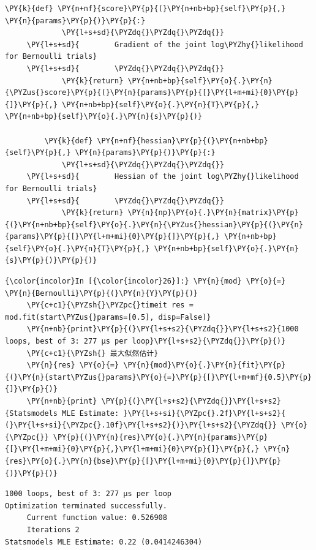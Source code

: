 \begin{Verbatim}[commandchars=\\\{\}]
         \PY{k}{def} \PY{n+nf}{score}\PY{p}{(}\PY{n+nb+bp}{self}\PY{p}{,} \PY{n}{params}\PY{p}{)}\PY{p}{:}
             \PY{l+s+sd}{\PYZdq{}\PYZdq{}\PYZdq{}}
     \PY{l+s+sd}{        Gradient of the joint log\PYZhy{}likelihood for Bernoulli trials}
     \PY{l+s+sd}{        \PYZdq{}\PYZdq{}\PYZdq{}}
             \PY{k}{return} \PY{n+nb+bp}{self}\PY{o}{.}\PY{n}{\PYZus{}score}\PY{p}{(}\PY{n}{params}\PY{p}{[}\PY{l+m+mi}{0}\PY{p}{]}\PY{p}{,} \PY{n+nb+bp}{self}\PY{o}{.}\PY{n}{T}\PY{p}{,} \PY{n+nb+bp}{self}\PY{o}{.}\PY{n}{s}\PY{p}{)}

         \PY{k}{def} \PY{n+nf}{hessian}\PY{p}{(}\PY{n+nb+bp}{self}\PY{p}{,} \PY{n}{params}\PY{p}{)}\PY{p}{:}
             \PY{l+s+sd}{\PYZdq{}\PYZdq{}\PYZdq{}}
     \PY{l+s+sd}{        Hessian of the joint log\PYZhy{}likelihood for Bernoulli trials}
     \PY{l+s+sd}{        \PYZdq{}\PYZdq{}\PYZdq{}}
             \PY{k}{return} \PY{n}{np}\PY{o}{.}\PY{n}{matrix}\PY{p}{(}\PY{n+nb+bp}{self}\PY{o}{.}\PY{n}{\PYZus{}hessian}\PY{p}{(}\PY{n}{params}\PY{p}{[}\PY{l+m+mi}{0}\PY{p}{]}\PY{p}{,} \PY{n+nb+bp}{self}\PY{o}{.}\PY{n}{T}\PY{p}{,} \PY{n+nb+bp}{self}\PY{o}{.}\PY{n}{s}\PY{p}{)}\PY{p}{)}
\end{Verbatim}

\begin{Verbatim}[commandchars=\\\{\}]
{\color{incolor}In [{\color{incolor}26}]:} \PY{n}{mod} \PY{o}{=} \PY{n}{Bernoulli}\PY{p}{(}\PY{n}{Y}\PY{p}{)}
     \PY{c+c1}{\PYZsh{}\PYZpc{}timeit res = mod.fit(start\PYZus{}params=[0.5], disp=False)}
     \PY{n+nb}{print}\PY{p}{(}\PY{l+s+s2}{\PYZdq{}}\PY{l+s+s2}{1000 loops, best of 3: 277 µs per loop}\PY{l+s+s2}{\PYZdq{}}\PY{p}{)}
     \PY{c+c1}{\PYZsh{} 最大似然估计}
     \PY{n}{res} \PY{o}{=} \PY{n}{mod}\PY{o}{.}\PY{n}{fit}\PY{p}{(}\PY{n}{start\PYZus{}params}\PY{o}{=}\PY{p}{[}\PY{l+m+mf}{0.5}\PY{p}{]}\PY{p}{)}
     \PY{n+nb}{print} \PY{p}{(}\PY{l+s+s2}{\PYZdq{}}\PY{l+s+s2}{Statsmodels MLE Estimate: }\PY{l+s+si}{\PYZpc{}.2f}\PY{l+s+s2}{ (}\PY{l+s+si}{\PYZpc{}.10f}\PY{l+s+s2}{)}\PY{l+s+s2}{\PYZdq{}} \PY{o}{\PYZpc{}} \PY{p}{(}\PY{n}{res}\PY{o}{.}\PY{n}{params}\PY{p}{[}\PY{l+m+mi}{0}\PY{p}{,}\PY{l+m+mi}{0}\PY{p}{]}\PY{p}{,} \PY{n}{res}\PY{o}{.}\PY{n}{bse}\PY{p}{[}\PY{l+m+mi}{0}\PY{p}{]}\PY{p}{)}\PY{p}{)}
\end{Verbatim}

\begin{Verbatim}[commandchars=\\\{\}]
1000 loops, best of 3: 277 µs per loop
Optimization terminated successfully.
     Current function value: 0.526908
     Iterations 2
Statsmodels MLE Estimate: 0.22 (0.0414246304)

\end{Verbatim}

